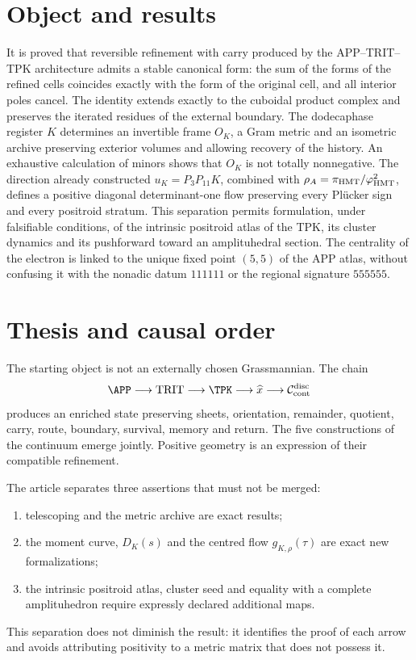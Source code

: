


\section*{Object and results}
It is proved that reversible refinement with carry produced by the APP--TRIT--TPK architecture admits a stable canonical form: the sum of the forms of the refined cells coincides exactly with the form of the original cell, and all interior poles cancel. The identity extends exactly to the cuboidal product complex and preserves the iterated residues of the external boundary. The dodecaphase register \(K\) determines an invertible frame \(O_K\), a Gram metric and an isometric archive preserving exterior volumes and allowing recovery of the history. An exhaustive calculation of minors shows that \(O_K\) is not totally nonnegative. The direction already constructed \(u_K=P_3P_{11}K\), combined with \(\rho_A=\pi_{\rm HMT}/\varphi_{\rm HMT}^2\), defines a positive diagonal determinant-one flow preserving every Plücker sign and every positroid stratum. This separation permits formulation, under falsifiable conditions, of the intrinsic positroid atlas of the TPK, its cluster dynamics and its pushforward toward an amplituhedral section. The centrality of the electron is linked to the unique fixed point \((5,5)\) of the APP atlas, without confusing it with the nonadic datum \(111111\) or the regional signature \(555555\).


\section{Thesis and causal order}

The starting object is not an externally chosen Grassmannian. The chain
\[
\APP\longrightarrow\mathrm{TRIT}\longrightarrow\TPK
\longrightarrow\widehat x
\longrightarrow\mathcal C_{\rm cont}^{\rm disc}
\]
produces an enriched state preserving sheets, orientation, remainder, quotient, carry, route, boundary, survival, memory and return. The five constructions of the continuum emerge jointly. Positive geometry is an expression of their compatible refinement.

The article separates three assertions that must not be merged:
\begin{enumerate}
\item telescoping and the metric archive are exact results;
\item the moment curve, \(D_K(s)\) and the centred flow \(g_{K,\rho}(\tau)\) are exact new formalizations;
\item the intrinsic positroid atlas, cluster seed and equality with a complete amplituhedron require expressly declared additional maps.
\end{enumerate}
This separation does not diminish the result: it identifies the proof of each arrow and avoids attributing positivity to a metric matrix that does not possess it.

